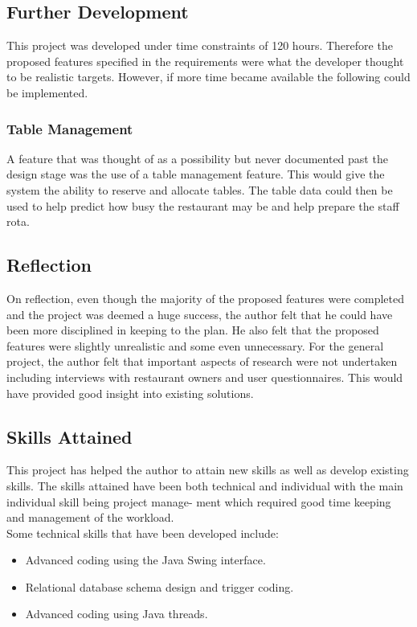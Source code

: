 \documentclass[12pt,a4paper]{article}
\newcommand\tab[1][1cm]{\hspace*{#1}}
\begin{document}
	\subsection{Further Development}
	\tab This project was developed under time constraints of 120 hours. Therefore the proposed features
specified in the requirements were what the developer thought to be realistic targets.
However, if more time became available the following could be implemented.
	\subsubsection{Table Management}
	\tab A feature that was thought of as a possibility but never documented past the design stage was the use
of a table management feature. This would give the system the ability to reserve and allocate tables.
The table data could then be used to help predict how busy the restaurant may be and help prepare
the staff rota.
	\subsection{Reflection}
	\tab On reflection, even though the majority of the proposed features were completed and the project was
deemed a huge success, the author felt that he could have been more disciplined in keeping to the plan.
He also felt that the proposed features were slightly unrealistic and some even unnecessary.
For the general project, the author felt that important aspects of research were not undertaken
including interviews with restaurant owners and user questionnaires. This would have provided good
insight into existing solutions.
	\subsection{Skills Attained}
	\tab This project has helped the author to attain new skills as well as develop existing skills. The skills
attained have been both technical and individual with the main individual skill being project manage-
ment which required good time keeping and management of the workload. \\
Some technical skills that
have been developed include:
	\begin{itemize}
		\item Advanced coding using the Java Swing interface.
		\item Relational database schema design and trigger coding.
		\item Advanced coding using Java threads.
	\end{itemize}
\end{document}
